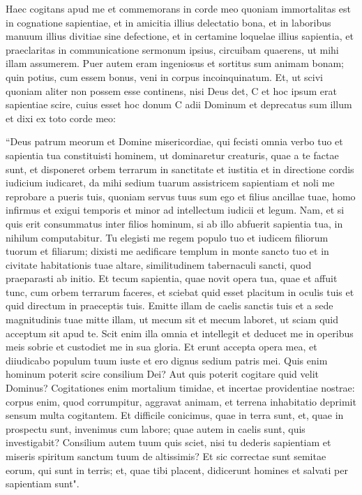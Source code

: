 \begin{biblechapter}
\verse Haec cogitans apud me et commemorans in corde meo quoniam immortalitas est in cognatione sapientiae, 
\verse et in amicitia illius delectatio bona, et in laboribus manuum illius divitiae sine defectione, et in certamine loquelae illius sapientia, et praeclaritas in communicatione sermonum ipsius, circuibam quaerens, ut mihi illam assumerem. 
\verse Puer autem eram ingeniosus et sortitus sum animam bonam; 
\verse quin potius, cum essem bonus, veni in corpus incoinquinatum. 
\verse Et, ut scivi quoniam aliter non possem esse continens, nisi Deus det, C et hoc ipsum erat sapientiae scire, cuius esset hoc donum C adii Dominum et deprecatus sum illum et dixi ex toto corde meo: 
\end{biblechapter}

\begin{biblechapter}  
\verse “Deus patrum meorum et Domine misericordiae, qui fecisti omnia verbo tuo 
\verse et sapientia tua constituisti hominem, ut dominaretur creaturis, quae a te factae sunt, 
\verse et disponeret orbem terrarum in sanctitate et iustitia et in directione cordis iudicium iudicaret, 
\verse da mihi sedium tuarum assistricem sapientiam et noli me reprobare a pueris tuis, 
\verse quoniam servus tuus sum ego et filius ancillae tuae, homo infirmus et exigui temporis et minor ad intellectum iudicii et legum. 
\verse Nam, et si quis erit consummatus inter filios hominum, si ab illo abfuerit sapientia tua, in nihilum computabitur. 
\verse Tu elegisti me regem populo tuo et iudicem filiorum tuorum et filiarum; 
\verse dixisti me aedificare templum in monte sancto tuo et in civitate habitationis tuae altare, similitudinem tabernaculi sancti, quod praeparasti ab initio. 
\verse Et tecum sapientia, quae novit opera tua, quae et affuit tunc, cum orbem terrarum faceres, et sciebat quid esset placitum in oculis tuis et quid directum in praeceptis tuis. 
\verse Emitte illam de caelis sanctis tuis et a sede magnitudinis tuae mitte illam, ut mecum sit et mecum laboret, ut sciam quid acceptum sit apud te. 
\verse Scit enim illa omnia et intellegit et deducet me in operibus meis sobrie et custodiet me in sua gloria. 
\verse Et erunt accepta opera mea, et diiudicabo populum tuum iuste et ero dignus sedium patris mei. 
\verse Quis enim hominum poterit scire consilium Dei? Aut quis poterit cogitare quid velit Dominus? 
\verse Cogitationes enim mortalium timidae, et incertae providentiae nostrae: 
\verse corpus enim, quod corrumpitur, aggravat animam, et terrena inhabitatio deprimit sensum multa cogitantem. 
\verse Et difficile conicimus, quae in terra sunt, et, quae in prospectu sunt, invenimus cum labore; quae autem in caelis sunt, quis investigabit? 
\verse Consilium autem tuum quis sciet, nisi tu dederis sapientiam et miseris spiritum sanctum tuum de altissimis? 
\verse Et sic correctae sunt semitae eorum, qui sunt in terris; et, quae tibi placent, didicerunt homines et salvati per sapientiam sunt". 
\end{biblechapter}

